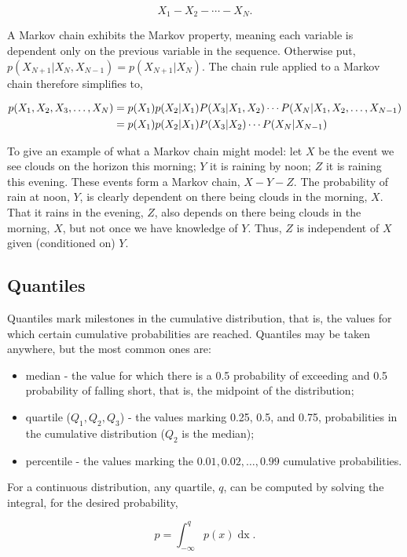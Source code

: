 \documentclass[11pt]{amsart}
\begin{document}
$$X_1 - X_2 - \cdots - X_N.$$

A Markov chain exhibits the Markov property, meaning each variable is dependent only on the previous variable in the sequence. Otherwise put, $p(X_{N+1}|X_N, X_{N-1}) = p(X_{N+1}|X_N)$. The chain rule applied to a Markov chain therefore simplifies to,

\begin{align}
p(X_1, X_2, X_3,\dots,X_N) &= p(X_1)p(X_2|X_1)P(X_3|X_1, X_2)\cdots P(X_N|X_1, X_2, \dots, X_{N-1}) \notag \\
 &= p(X_1)p(X_2|X_1)P(X_3|X_2)\cdots P(X_N|X_{N-1}) \notag
\end{align}

To give an example of what a Markov chain might model: let $X$ be the event we see clouds on the horizon this morning; $Y$ it is raining by noon; $Z$ it is raining this evening. These events form a Markov chain, $X-Y-Z$. The probability of rain at noon, $Y$, is clearly dependent on there being clouds in the morning, $X$. That it rains in the evening, $Z$, also depends on there being clouds in the morning, $X$, but not once we have knowledge of $Y$. Thus, $Z$ is independent of $X$ given (conditioned on) $Y$.

\subsection{Quantiles}

Quantiles mark milestones in the cumulative distribution, that is, the values for which certain cumulative probabilities are reached. Quantiles may be taken anywhere, but the most common ones are:

\begin{itemize}
\item median - the value for which there is a 0.5 probability of exceeding and 0.5 probability of falling short, that is, the midpoint of the distribution;
\item quartile ($Q_1, Q_2, Q_3$) - the values marking 0.25, 0.5, and 0.75, probabilities in the cumulative distribution ($Q_2$ is the median);
\item percentile - the values marking the $0.01, 0.02, \dots, 0.99$ cumulative probabilities.
\end{itemize}

For a continuous distribution, any quartile, $q$, can be computed by solving the integral, for the desired probability,

$$
p = \int_{-\infty}^{q} p(x) \mathop{dx}.
$$
\end{document}
